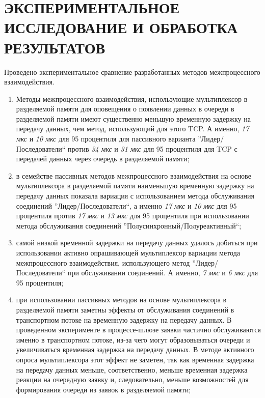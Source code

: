 \chapter{ЭКСПЕРИМЕНТАЛЬНОЕ ИССЛЕДОВАНИЕ И ОБРАБОТКА РЕЗУЛЬТАТОВ}\label{chapter41}





\chapterconclusion

Проведено экспериментальное сравнение разработанных методов межпроцессного взаимодействия.
\begin{enumerate}
\item Методы межпроцессного взаимодействия, использующие мультиплексор в разделяемой памяти для оповещения о появлении данных в очереди в разделяемой памяти имеют существенно меньшую временную задержку на передачу данных, чем метод, использующий для этого TCP. А именно, \textit{17 мкс} и \textit{10 мкс} для 95 процентиля для пассивного варианта ''Лидер/Последователи`` против \textit{34 мкс} и \textit{31 мкс} для 95 процентиля для TCP с передачей данных через очередь в разделяемой памяти;
\item в семействе пассивных методов межпроцессного взаимодействия на основе мультиплексора в разделяемой памяти наименьшую временную задержку на передачу данных показала вариация с использованием метода обслуживания соединений ''Лидер/Последователи``, а именно \textit{17 мкс} и \textit{10 мкс} для 95 процентиля против \textit{17 мкс} и \textit{13 мкс} для 95 процентиля при использовании метода обслуживания соединений ''Полусинхронный/Полуреактивный``;
\item самой низкой временной задержки на передачу данных удалось добиться при использовании активно опрашивающей мультиплексор вариации метода межпроцессного взаимодействия, использующего метод ''Лидер/Последователи`` при обслуживании соединений. А именно, \textit{7 мкс} и \textit{6 мкс} для 95 процентиля;
\item при использовании пассивных методов на основе мультиплексора в разделяемой памяти заметны эффекты от обслуживания соединений в транспортном потоке на временную задержку на передачу данных. В проведенном эксперименте в процессе-шлюзе заявки частично обслуживаются именно в транспортном потоке, из-за чего могут образовываться очереди и увеличиваться временная задержка на передачу данных. В методе активного опроса мультиплексора этот эффект не заметен, так как временная задержка на передачу данных меньше, соответственно, меньше временная задержка реакции на очередную заявку и, следовательно, меньше возможностей для формирования очереди из заявок в разделяемой памяти;

\end{enumerate}
